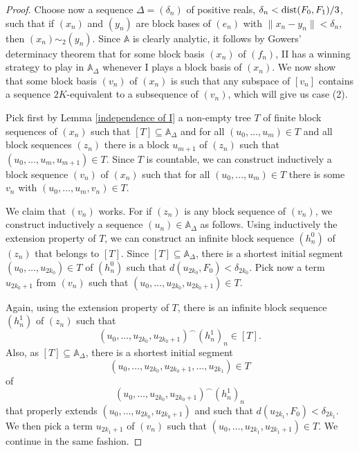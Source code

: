 \documentclass[10pt]{amsart}
\numberwithin{equation}{section}
\begin{document}
\begin{proof}
Choose now a sequence $\Delta=(\delta_n)$ of positive reals, $\delta_n<{\rm
  dist}(F_0,F_1)/3$, such that if $(x_n)$ and $(y_n)$ are block bases of
$(e_n)$ with $\|x_n-y_n\|<\delta_n$, then $(x_n)\sim_2(y_n)$. Since ${\mathbb A}$ is
clearly analytic, it follows by Gowers' determinacy theorem that for some
block basis $(x_n)$ of $(f_n)$, II has a winning strategy to play in
${\mathbb A}_\Delta$ whenever I plays a block basis of $(x_n)$. We now show that some
block basis $(v_n)$ of $(x_n)$ is
 such that any subspace of $[v_n]$ contains a sequence $2K$-equivalent to a subsequence of $(v_n)$, which will give us case (2).

Pick first by Lemma \ref{independence of I}  a non-empty tree $T$ of finite
block sequences of $(x_n)$ such that $[T]\subseteq {\mathbb A}_\Delta$ and for all
$(u_0,\ldots,u_m)\in T$ and all block sequences $(z_n)$ there is a block
$u_{m+1}$ of $(z_n)$ such that $(u_0,\ldots,u_m, u_{m+1})\in T$. Since $T$ is
countable, we can construct inductively a block sequence $(v_n)$ of $(x_n)$
such that for all $(u_0,\ldots,u_m)\in T$ there is some $v_n$ with
$(u_0,\ldots,u_m,v_n)\in T$.

We claim that $(v_n)$ works. For if $(z_n)$ is any block sequence of $(v_n)$,
we construct inductively a  sequence $(u_n)\in {\mathbb A}_\Delta$ as follows. Using
inductively the extension property of $T$, we can construct an infinite block
sequence $(h^{0}_n)$ of $(z_n)$ that belongs to $[T]$. Since  $[T]\subseteq
{\mathbb A}_\Delta$, there is a shortest initial segment $(u_0,\ldots, u_{2k_0})\in T$
of $(h^{0}_n)$ such that $d(u_{2k_0},F_0)<\delta_{2k_0}$. Pick now a term
$u_{2k_0+1}$ from $(v_n)$ such that $(u_0,\ldots,u_{2k_0},u_{2k_0+1})\in T$.

Again, using the extension property of $T$, there is an infinite block sequence
$(h_n^{1})$ of $(z_n)$ such that
$$
(u_0,\ldots,u_{2k_0},u_{2k_0+1})^\frown(h_n^{1})_n\in[T].
$$
 Also, as $[T]\subseteq {\mathbb A}_\Delta$, there is a shortest initial segment
 $$
 (u_0,\ldots,u_{2k_0},u_{2k_0+1}, \ldots,u_{2k_1})\in T
 $$
 of
 $$
 (u_0,\ldots,u_{2k_0},u_{2k_0+1})^\frown(h_n^{1})_n
 $$
that properly extends $(u_0,\ldots,u_{2k_0},u_{2k_0+1})$ and such that
$d(u_{2k_1},F_0)<\delta_{2k_1}$. We then pick a term $u_{2k_1+1}$ of $(v_n)$
such that $(u_0,\ldots,u_{2k_1},u_{2k_1+1})\in T$. We continue in the same
fashion.


\end{proof}
\end{document}
